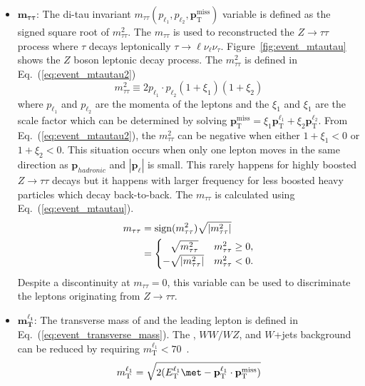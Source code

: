 \begin{itemize}
    \item $\mathbf{m_{\tau\tau}}$: The di-tau invariant $m_{\tau\tau}(p_{\ell_{1}}, p_{\ell_{2}}, \mathbf{p}_{\mathrm{T}}^{\mathrm{miss}})$ variable is defined as the signed square root of $m^{2}_{\tau\tau}$.
    The $m_{\tau\tau}$ is used to reconstructed the $Z \to \tau \tau$ process where $\tau$ decays leptonically $\tau \to \ell \nu_{\ell} \nu_{\tau}$.
    Figure~\ref{fig:event_mtautau} shows the $Z$ boson leptonic decay process.
    The $m^{2}_{\tau\tau}$ is defined in Eq.~(\ref{eq:event_mtautau2})
    \begin{equation}
        m^{2}_{\tau\tau} \equiv 2 p_{\ell_{1}} \cdot p_{\ell_{2}} (1 + \xi_{1})(1+ \xi_{2})
        \label{eq:event_mtautau2}
    \end{equation}
    where $p_{\ell_{1}}$ and $p_{\ell_{2}}$ are the momenta of the leptons and the $\xi_{1}$ and $\xi_{1}$ are the scale factor which can be determined by solving $\mathbf{p}_\mathrm{T}^\mathrm{miss} = \xi_{1} \mathbf{p}_\mathrm{T}^{\ell_{1}} + \xi_{2} \mathbf{p}_\mathrm{T}^{\ell_{2}}$.
    From Eq.~(\ref{eq:event_mtautau2}), the $m^{2}_{\tau\tau}$ can be negative when either $1 + \xi_{1} < 0$ or $1 + \xi_{2} < 0$.
    This situation occurs when only one lepton moves in the same direction as $\mathbf{p}_{hadronic}$ and $|\mathbf{p}_{\ell}|$ is small. 
    This rarely happens for highly boosted $Z \to \tau \tau$ decays but it happens with larger frequency for less boosted heavy particles which decay back-to-back.
    The $m_{\tau\tau}$ is calculated using Eq.~(\ref{eq:event_mtautau}).
    \begin{align}
        m_{\tau\tau} & = \mathrm{sign}(m^{2}_{\tau\tau}) \sqrt{|m^{2}_{\tau\tau}|}\\
                     & = 
                     \begin{cases}
                         \hphantom{-}\sqrt{m_{\tau\tau}^2}    & m_{\tau\tau}^2 \geq 0,\\
                         -\sqrt{\left| m_{\tau\tau}^2\right|} & m_{\tau\tau}^2 < 0.
                     \end{cases}
        \label{eq:event_mtautau}
    \end{align}
    Despite a discontinuity at $m_{\tau\tau} = 0$, this variable can be used to discriminate the leptons originating from $Z\to \tau\tau$.

    \item $\mathbf{m_{T}^{\ell_{1}}}$: The transverse mass of \met and the leading lepton is defined in Eq.~(\ref{eq:event_transverse_mass}).
    The \ttbar, $WW/WZ$, and $W$+jets background can be reduced by requiring $m_{\textrm{T}}^{\ell_{1}} < 70$~{\GeV}.
    \begin{equation}
        m_{\textrm{T}}^{\ell_{1}} = \sqrt{2(E_{\textrm{T}}^{\ell_{1}}\met - \mathbf{p}_{\textrm{T}}^{\ell_{1}} \cdot \mathbf{p}_{\textrm{T}}^{\textrm{miss}})}
        \label{eq:event_transverse_mass}
    \end{equation}


\end{itemize}
